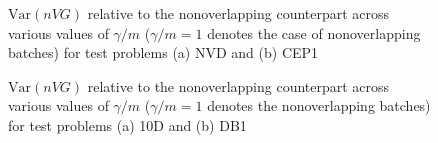 \documentclass[12pt]{article}
\newcommand{\var}[1]{\mathrm{Var} \left( #1 \right)}
\begin{document}
\begin{figure}[htb!]
	\centering
	\caption{
		$\var{n VG}$ relative to the nonoverlapping counterpart across various values of $\gamma/m$ ($\gamma/m=1$ denotes the case of nonoverlapping batches) for test problems
		(a) NVD and
		(b) CEP1
	}
\label{fig:varvar1}
\end{figure}

\begin{figure}[htb!]
	\centering
		\caption{
		$\var{n VG}$ relative to the nonoverlapping counterpart across various values of $\gamma/m$ ($\gamma/m=1$ denotes the nonoverlapping batches) for test problems
		(a) 10D and
		(b) DB1
		}
\label{fig:varvar2}
\end{figure}
\end{document}
